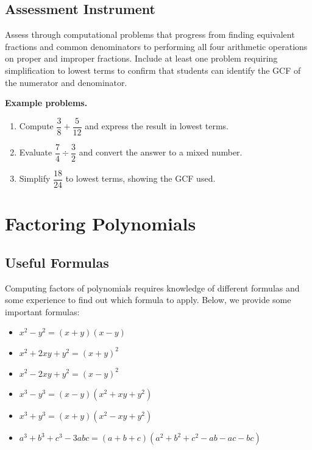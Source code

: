 \subsection{Assessment Instrument}
\label{ssec:asse-06cc}

Assess through computational problems that progress from finding equivalent fractions and
common denominators to performing all four arithmetic operations on proper and improper
fractions. Include at least one problem requiring simplification to lowest terms to
confirm that students can identify the GCF of the numerator and denominator.

\textbf{Example problems.}

\begin{enumerate}
    \item Compute $\dfrac{3}{8} + \dfrac{5}{12}$ and express the result in lowest terms.
    \item Evaluate $\dfrac{7}{4} \div \dfrac{3}{2}$ and convert the answer to a mixed number.
    \item Simplify $\dfrac{18}{24}$ to lowest terms, showing the GCF used.
\end{enumerate}

\section{Factoring Polynomials}
\label{sec:fact-754c}
\subsection{Useful Formulas}
\label{sss:usef-1334}

Computing factors of polynomials requires knowledge of different formulas and some
experience to find out which formula to apply. Below, we provide some important formulas:

\begin{itemize}
    \item $x^2 - y^2 = (x + y)(x - y)$
    \item $x^2 + 2xy + y^2 = (x + y)^2$
    \item $x^2 - 2xy + y^2 = (x - y)^2$
    \item $x^3 - y^3 = (x - y)(x^2 + xy + y^2)$
    \item $x^3 + y^3 = (x + y)(x^2 - xy + y^2)$
    \item $a^3 + b^3 + c^3 - 3abc = (a + b + c)(a^2 + b^2 + c^2 - ab - ac - bc)$
\end{itemize}

